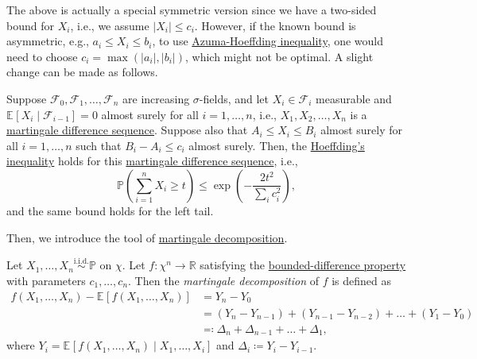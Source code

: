 The above is actually a special symmetric version since we have a two-sided bound for \(X_i\), i.e., we assume \(\vert X_i \vert \leq c_i\). However, if the known bound is asymmetric, e.g., \(a_i \leq X_i \leq b_i\), to use \hyperref[thm:Azuma-Hoeffding-inequality]{Azuma-Hoeffding inequality}, one would need to choose \(c_i = \max (\vert a_i \vert , \vert b_i \vert )\), which might not be optimal. A slight change can be made as follows.

\begin{corollary}\label{col:general-Azuma-Hoeffding-inequality}
	Suppose \(\mathcal{F} _0, \mathcal{F} _1, \dots , \mathcal{F} _n \) are increasing \(\sigma \)-fields, and let \(X_i \in \mathcal{F} _i\) measurable and \(\mathbb{E}_{}\left[X_i \mid \mathcal{F} _{i-1} \right] = 0\) almost surely for all \(i=1, \dots , n\), i.e., \(X_1, X_2, \dots , X_n\) is a \hyperref[def:martingale-difference-sequence]{martingale difference sequence}. Suppose also that \(A_i \leq X_i \leq B_i\) almost surely for all \(i = 1, \dots , n\) such that \(B_i - A_i \leq c_i\) almost surely. Then, the \hyperref[thm:Hoeffding-inequality]{Hoeffding's inequality} holds for this \hyperref[def:martingale-difference-sequence]{martingale difference sequence}, i.e.,
	\[
		\mathbb{P} \left( \sum_{i=1}^{n} X_i \geq t \right) \leq \exp(- \frac{2 t^2}{\sum_{i} c_i^2}),
	\]
	and the same bound holds for the left tail.
\end{corollary}

Then, we introduce the tool of \hyperref[def:martingale-decomposition]{martingale decomposition}.

\begin{definition}\label{def:martingale-decomposition}
	Let \(X_1, \dots , X_n \overset{\text{i.i.d.} }{\sim } \mathbb{P}\) on \(\chi \). Let \(f \colon \chi ^n \to \mathbb{R} \) satisfying the \hyperref[def:bounded-difference-property]{bounded-difference property} with parameters \(c_1, \dots , c_n\). Then the \emph{martingale decomposition} of \(f\) is defined as
	\[
		\begin{split}
			f(X_1, \dots , X_n) - \mathbb{E}_{}\left[f(X_1, \dots , X_n) \right]
			 & = Y_n - Y_0                                                   \\
			 & = (Y_n - Y_{n-1}) + (Y_{n-1} - Y_{n-2}) + \dots + (Y_1 - Y_0) \\
			 & \eqqcolon \Delta _n + \Delta _{n-1} + \dots + \Delta _1,
		\end{split}
	\]
	where \(Y_i = \mathbb{E}_{}\left[f(X_1, \dots , X_n) \mid X_1, \dots , X_i \right] \) and \(\Delta _i \coloneqq Y_i - Y_{i-1}\).
\end{definition}

